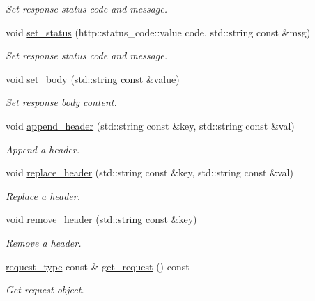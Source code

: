 \begin{DoxyCompactItemize}
\begin{DoxyCompactList}\small\item\em Set response status code and message. \end{DoxyCompactList}\item 
void \mbox{\hyperlink{classwebsocketpp_1_1connection_a97b4513339167df8653a11ef3ccc65b1}{set\+\_\+status}} (http\+::status\+\_\+code\+::value code, std\+::string const \&msg)
\begin{DoxyCompactList}\small\item\em Set response status code and message. \end{DoxyCompactList}\item 
void \mbox{\hyperlink{classwebsocketpp_1_1connection_a40bb318c3b9294018d217d0271a7b3da}{set\+\_\+body}} (std\+::string const \&value)
\begin{DoxyCompactList}\small\item\em Set response body content. \end{DoxyCompactList}\item 
void \mbox{\hyperlink{classwebsocketpp_1_1connection_af8cb78acc61b8a3d59f6162cdba6318b}{append\+\_\+header}} (std\+::string const \&key, std\+::string const \&val)
\begin{DoxyCompactList}\small\item\em Append a header. \end{DoxyCompactList}\item 
void \mbox{\hyperlink{classwebsocketpp_1_1connection_a96e4adcdb9b3473ca96e2aac27ff7147}{replace\+\_\+header}} (std\+::string const \&key, std\+::string const \&val)
\begin{DoxyCompactList}\small\item\em Replace a header. \end{DoxyCompactList}\item 
void \mbox{\hyperlink{classwebsocketpp_1_1connection_a63094895d9dcfb4d10974ae97ea319a1}{remove\+\_\+header}} (std\+::string const \&key)
\begin{DoxyCompactList}\small\item\em Remove a header. \end{DoxyCompactList}\item 
\mbox{\hyperlink{classwebsocketpp_1_1http_1_1parser_1_1request}{request\+\_\+type}} const  \& \mbox{\hyperlink{classwebsocketpp_1_1connection_a9d1a9846185e34cbe9ecada12b30e076}{get\+\_\+request}} () const
\begin{DoxyCompactList}\small\item\em Get request object. \end{DoxyCompactList}\item 

\end{DoxyCompactItemize}
